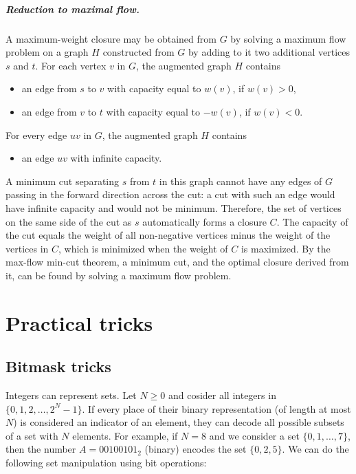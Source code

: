 \documentclass[a4paper, twoside,openany]{book}
\newcounter{problem}\setcounter{problem}{0}
\begin{document}
\paragraph{Reduction to maximal flow.}
A maximum-weight closure may be obtained from $G$ by solving a maximum flow problem on a graph $H$ constructed from $G$ by adding to it two additional vertices $s$ and $t$. 
For each vertex $v$ in $G$, the augmented graph $H$ contains
\begin{itemize}
\item an edge from $s$ to $v$ with capacity equal to $w(v)$, if $w(v) > 0$,
\item an edge from $v$ to $t$ with capacity equal to $-w(v)$, if $w(v) < 0$.
\end{itemize}
For every edge $uv$ in $G$, the augmented graph $H$ contains
\begin{itemize}
\item an edge $uv$ with infinite capacity.
\end{itemize}
A minimum cut separating $s$ from $t$ in this graph cannot have any edges of $G$ passing in the forward direction across the cut: a cut with such an edge would have infinite capacity and would not be minimum. 
Therefore, the set of vertices on the same side of the cut as $s$ automatically forms a closure $C$. 
The capacity of the cut equals the weight of all non-negative vertices minus the weight of the vertices in $C$, which is minimized when the weight of $C$ is maximized. 
By the max-flow min-cut theorem, a minimum cut, and the optimal closure derived from it, can be found by solving a maximum flow problem.

\chapter{Practical tricks}

\section{Bitmask tricks}
\label{bitmask}

Integers can represent sets. Let $N \geq 0$ and cosider all integers in $\{ 0, 1, 2, \ldots, 2^N-1 \}$. If every place of their binary representation (of length at most $N$) is considered an indicator of an element, they can decode all possible subsets of a set with $N$ elements. For example, if $N=8$ and we consider a set $\{ 0, 1, \ldots, 7\}$, then the number $A=00100101_2$ (binary) encodes the set $\{ 0, 2, 5 \}$. We can do the following set manipulation using bit operations:
\end{document}
